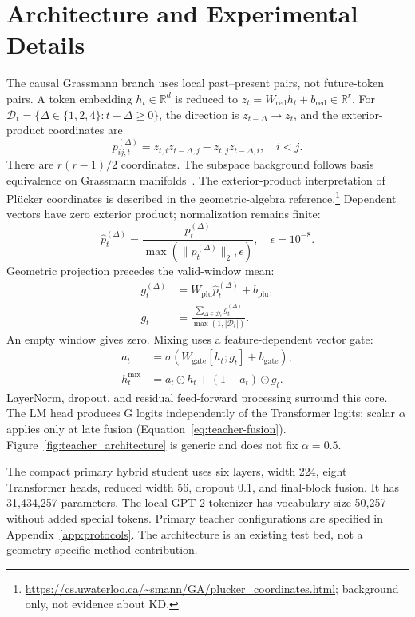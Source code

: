 \section{Architecture and Experimental Details}\label{app:architecture}

The causal Grassmann branch uses local past--present pairs, not future-token pairs. A token embedding $h_t\in\mathbb R^d$ is reduced to $z_t=W_{\mathrm{red}}h_t+b_{\mathrm{red}}\in\mathbb R^r$. For $\mathcal D_t=\{\Delta\in\{1,2,4\}:t-\Delta\geq0\}$, the direction is $z_{t-\Delta}\rightarrow z_t$, and the exterior-product coordinates are
\begin{equation}
p_{ij,t}^{(\Delta)}=z_{t,i}z_{t-\Delta,j}-z_{t,j}z_{t-\Delta,i},\quad i<j.
\end{equation}
There are $r(r-1)/2$ coordinates. The subspace background follows basis equivalence on Grassmann manifolds~\citep{edelman1998geometry}. The exterior-product interpretation of Pl\"ucker coordinates is described in the geometric-algebra reference.\footnote{\url{https://cs.uwaterloo.ca/~smann/GA/plucker_coordinates.html}; background only, not evidence about KD.}
Dependent vectors have zero exterior product; normalization remains finite:
\begin{equation}
\widehat p_t^{(\Delta)}=\frac{p_t^{(\Delta)}}{\max(\|p_t^{(\Delta)}\|_2,\epsilon)},\quad\epsilon=10^{-8}.
\end{equation}
Geometric projection precedes the valid-window mean:
\begin{align}
g_t^{(\Delta)}&=W_{\mathrm{plu}}\widehat p_t^{(\Delta)}+b_{\mathrm{plu}},\\
g_t&=\frac{\sum_{\Delta\in\mathcal D_t}g_t^{(\Delta)}}{\max(1,|\mathcal D_t|)}.
\end{align}
An empty window gives zero. Mixing uses a feature-dependent vector gate:
\begin{align}
a_t&=\sigma(W_{\mathrm{gate}}[h_t;g_t]+b_{\mathrm{gate}}),\\
h_t^{\mathrm{mix}}&=a_t\odot h_t+(1-a_t)\odot g_t.
\end{align}
LayerNorm, dropout, and residual feed-forward processing surround this core. The LM head produces G logits independently of the Transformer logits; scalar $\alpha$ applies only at late fusion (Equation~\ref{eq:teacher-fusion}). Figure~\ref{fig:teacher_architecture} is generic and does not fix $\alpha=0.5$.

The compact primary hybrid student uses six layers, width 224, eight Transformer heads, reduced width 56, dropout 0.1, and final-block fusion. It has 31,434,257 parameters. The local GPT-2 tokenizer has vocabulary size 50,257 without added special tokens. Primary teacher configurations are specified in Appendix~\ref{app:protocols}. The architecture is an existing test bed, not a geometry-specific method contribution.

